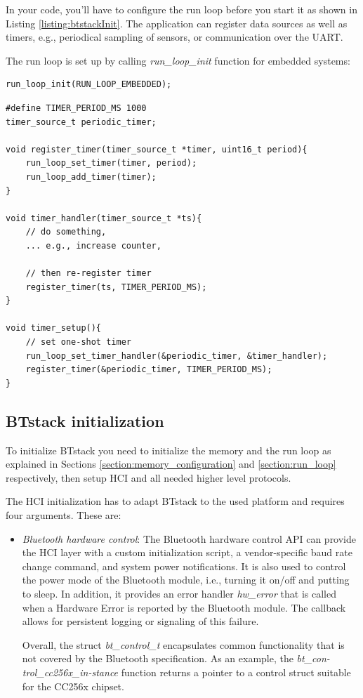 \documentclass[a4paper,titlepage,oneside,12pt]{amsart} %
\begin{document}
In your code, you'll have to configure the run loop before you start it as shown in Listing \ref{listing:btstackInit}. The application can register data sources as well as timers, e.g., periodical sampling of sensors, or communication over the UART.

The run loop is set up by calling \emph{run\_loop\_init} function for embedded systems:
\begin{lstlisting}
run_loop_init(RUN_LOOP_EMBEDDED);
\end{lstlisting}


\begin{lstlisting}[float, caption=Periodic counter, label=PeriodicTimerHandler]
#define TIMER_PERIOD_MS 1000
timer_source_t periodic_timer;

void register_timer(timer_source_t *timer, uint16_t period){
    run_loop_set_timer(timer, period);
    run_loop_add_timer(timer);
}

void timer_handler(timer_source_t *ts){
    // do something,
    ... e.g., increase counter,
    
    // then re-register timer
    register_timer(ts, TIMER_PERIOD_MS);
} 

void timer_setup(){
    // set one-shot timer
    run_loop_set_timer_handler(&periodic_timer, &timer_handler);
    register_timer(&periodic_timer, TIMER_PERIOD_MS);
}
\end{lstlisting}

\subsection{BTstack initialization}
\label{section:btstack_initialization}
To initialize BTstack you need to initialize the memory and the run loop as explained in Sections \ref{section:memory_configuration} and \ref{section:run_loop} respectively, then setup HCI and all needed higher level protocols.

The HCI initialization has to adapt BTstack to the used platform and requires four arguments. These are:
\begin{itemize}
\item \emph{Bluetooth hardware control}: The Bluetooth hardware control API can provide the HCI layer with a custom initialization script, a vendor-specific baud rate change command, and system power notifications. It is also used to control the power mode of the Bluetooth module, i.e., turning it on/off and putting to sleep. In addition, it provides an error handler \emph{hw\_error} that is called when a Hardware Error is reported by the Bluetooth module. The callback allows for persistent logging or signaling of this failure. 

Overall, the struct \emph{bt\_control\_t} encapsulates common functionality that is not covered by the Bluetooth specification. As an example, the \emph{bt\_con-trol\_cc256x\_in-stance} function returns a pointer to a control struct suitable for the CC256x chipset.
\end{itemize}
\end{document}
